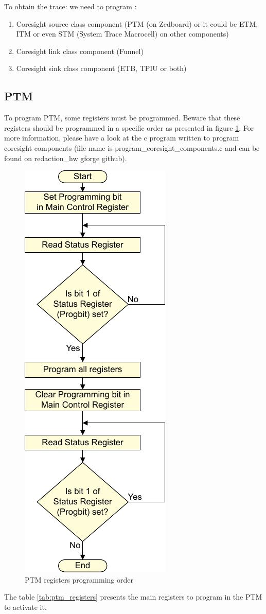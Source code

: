 \documentclass[10pt,a4paper, oneside]{memoir}
\begin{document}
To obtain the trace: we need to program :
\begin{enumerate}
\item Coresight source class component (PTM (on Zedboard) or it could be ETM, ITM or even STM (System Trace Macrocell) on other components)
\item Coresight link class component (Funnel)
\item Coresight sink class component (ETB, TPIU or both)
\end{enumerate}

\subsection{PTM}
To program PTM, some registers must be programmed. Beware that these registers should be programmed in a specific order as presented in figure \ref{fig:program_ptm_order}. For more information, please have a look at the c program written to program coresight components (file name is program\_coresight\_components.c and can be found on redaction\_hw gforge github). 


\begin{figure}
\centering
\includegraphics[width=.2\textwidth, keepaspectratio]{images/coresight/programming_ptm_registers}
\caption{PTM registers programming order}
\label{fig:program_ptm_order}
\end{figure}


The table \ref{tab:ptm_registers} presents the main registers to program in the PTM to activate it.
\end{document}
